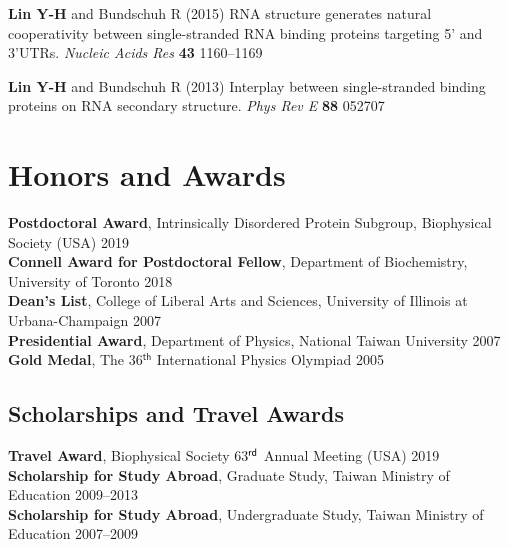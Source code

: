 \documentclass[11pt]{../yhlcv}
\def\tname#1{{\bf #1}}
\begin{document}
\begin{etaremune}[leftmargin=0.26in]
\item 
\tname{Lin Y-H} and Bundschuh R (2015) 
RNA structure generates natural cooperativity between single-stranded RNA binding proteins targeting 5' and 3'UTRs.
{\it Nucleic Acids Res} {\bf 43} 1160--1169

\item 
\tname{Lin Y-H} and Bundschuh R (2013) 
Interplay between single-stranded binding proteins on RNA secondary structure.
{\it Phys Rev E} {\bf 88} 052707


\end{etaremune} 



\section*{Honors and Awards}

\noindent
{\bf Postdoctoral Award}, Intrinsically Disordered Protein Subgroup, Biophysical Society (USA) \hfill 2019 \\
{\bf Connell Award for Postdoctoral Fellow}, Department of Biochemistry, University of Toronto \hfill 2018 \\
{\bf Dean's List}, College of Liberal Arts and Sciences, University of Illinois at Urbana-Champaign \hfill 2007 \\
{\bf Presidential Award}, Department of Physics, National Taiwan University \hfill 2007 \\
{\bf Gold Medal}, The 36$^{ \mathsf{th}}$ International Physics Olympiad \hfill 2005

\subsection*{Scholarships and Travel Awards} 
{\bf Travel Award}, Biophysical Society 63$^{\sf rd}$ Annual Meeting (USA) \hfill 2019 \\
{\bf Scholarship for Study Abroad}, Graduate Study, Taiwan Ministry of Education \hfill 2009--2013 \\
{\bf Scholarship for Study Abroad}, Undergraduate Study, Taiwan Ministry of Education \hfill 2007--2009 
\end{document}
